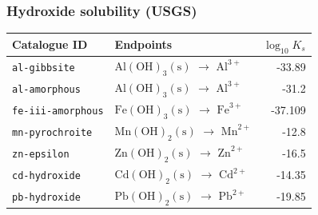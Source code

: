 \documentclass[a4paper,11pt]{ltxdoc}
\begin{document}
\subsubsection{Hydroxide solubility (USGS)}
\begin{longtable}{@{}>{\raggedright\arraybackslash}p{42mm}p{87mm}r@{}}
Catalogue ID & Endpoints & $\log_{10}K_s$\\\hline
\endhead
\texttt{al-gibbsite} & $\mathrm{Al}(\mathrm{O}\mathrm{H})_{3}\mathrm{(s)}$ $\to$ $\mathrm{Al}^{3+}$ & -33.89\\
\texttt{al-amorphous} & $\mathrm{Al}(\mathrm{O}\mathrm{H})_{3}\mathrm{(s)}$ $\to$ $\mathrm{Al}^{3+}$ & -31.2\\
\texttt{fe-iii-amorphous} & $\mathrm{Fe}(\mathrm{O}\mathrm{H})_{3}\mathrm{(s)}$ $\to$ $\mathrm{Fe}^{3+}$ & -37.109\\
\texttt{mn-pyrochroite} & $\mathrm{Mn}(\mathrm{O}\mathrm{H})_{2}\mathrm{(s)}$ $\to$ $\mathrm{Mn}^{2+}$ & -12.8\\
\texttt{zn-epsilon} & $\mathrm{Zn}(\mathrm{O}\mathrm{H})_{2}\mathrm{(s)}$ $\to$ $\mathrm{Zn}^{2+}$ & -16.5\\
\texttt{cd-hydroxide} & $\mathrm{Cd}(\mathrm{O}\mathrm{H})_{2}\mathrm{(s)}$ $\to$ $\mathrm{Cd}^{2+}$ & -14.35\\
\texttt{pb-hydroxide} & $\mathrm{Pb}(\mathrm{O}\mathrm{H})_{2}\mathrm{(s)}$ $\to$ $\mathrm{Pb}^{2+}$ & -19.85\\
\end{longtable}
\end{document}

